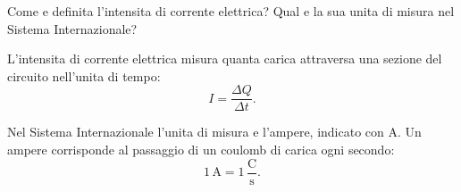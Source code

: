 
\begin{esercizio}
Come e definita l'intensita di corrente elettrica? Qual e la sua unita di
misura nel Sistema Internazionale?
\end{esercizio}

\begin{soluzione}
L'intensita di corrente elettrica misura quanta carica attraversa una sezione
del circuito nell'unita di tempo:
\[
I=\frac{\Delta Q}{\Delta t}.
\]

Nel Sistema Internazionale l'unita di misura e l'ampere, indicato con
\(\mathrm{A}\). Un ampere corrisponde al passaggio di un coulomb di carica ogni
secondo:
\[
1\,\mathrm{A}=1\,\frac{\mathrm{C}}{\mathrm{s}}.
\]
\end{soluzione}
